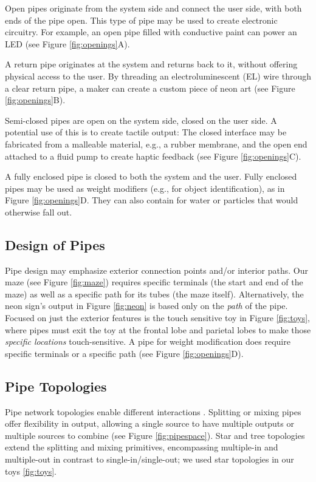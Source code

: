 Open pipes originate from the system side and connect the user side, with both ends of the pipe open. This type of pipe may be used to create electronic circuitry.  For example, an open pipe filled with conductive paint can power an LED (see Figure \ref{fig:openings}A).

A return pipe originates at the system and returns back to it, without offering physical access to the user.  By threading an electroluminescent (EL) wire through a clear return pipe, a maker can create a custom piece of neon art (see Figure \ref{fig:openings}B). 

Semi-closed pipes are open on the system side, closed on the user side. A potential use of this is to create tactile output: The closed interface may be fabricated from a malleable material, e.g., a rubber membrane, and the open end attached to a fluid pump to create haptic feedback (see Figure \ref{fig:openings}C).

A fully enclosed pipe is closed to both the system and the user.  Fully enclosed pipes may be used as weight modifiers (e.g., for object identification), as in Figure \ref{fig:openings}D.  They can also contain for water or particles that would otherwise fall out.

\subsection{Design of Pipes}
Pipe design may emphasize exterior connection points and/or interior paths.  Our maze (see Figure \ref{fig:maze}) requires specific terminals (the start and end of the maze) as well as a specific path for its tubes (the maze itself).  Alternatively, the neon sign's output in Figure \ref{fig:neon} is based only on the \emph{path} of the pipe.  Focused on just the exterior features is the touch sensitive toy in Figure \ref{fig:toys}, where pipes must exit the toy at the frontal lobe and parietal lobes to make those \emph{specific locations} touch-sensitive.  A pipe for weight modification does require specific terminals or a specific path (see Figure \ref{fig:openings}D).

\subsection{Pipe Topologies}

Pipe network topologies enable different interactions .  Splitting or mixing pipes offer flexibility in output, allowing a single source to have multiple outputs or multiple sources to combine (see Figure \ref{fig:pipespace}).  Star and tree topologies extend the splitting and mixing primitives, encompassing multiple-in and multiple-out in contrast to single-in/single-out; we used star topologies in our toys \ref{fig:toys}.

